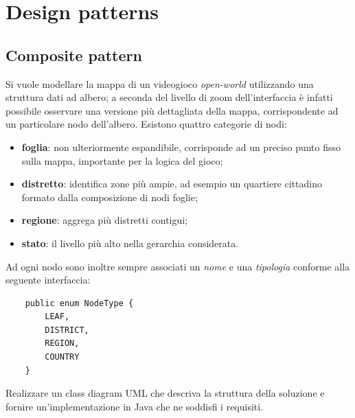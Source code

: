 \documentclass[12pt,a4paper]{article}
\begin{document}
\tableofcontents
\clearpage
	
\section{Design patterns}
    \subsection{Composite pattern}
    
    \begin{Exercise}[label=composite-ex1]
        Si vuole modellare la mappa di un videogioco \textit{open-world} utilizzando una struttura dati ad albero; a seconda del livello di zoom dell'interfaccia è infatti possibile osservare una versione più dettagliata della mappa, corrispondente ad un particolare nodo dell'albero.
        Esistono quattro categorie di nodi:
        \begin{itemize}
            \item \textbf{foglia}: non ulteriormente espandibile, corrisponde ad un preciso punto fisso sulla mappa, importante per la logica del gioco;
            \item \textbf{distretto}: identifica zone più ampie, ad esempio un quartiere cittadino formato dalla composizione di nodi foglie;
            \item \textbf{regione}: aggrega più distretti contigui;
            \item \textbf{stato}: il livello più alto nella gerarchia considerata.
        \end{itemize}
        Ad ogni nodo sono inoltre sempre associati un \textit{nome} e una \textit{tipologia} conforme alla seguente interfaccia:
        \begin{lstlisting}
    public enum NodeType {
        LEAF,
        DISTRICT,
        REGION,
        COUNTRY
    }
        \end{lstlisting}
        
        Realizzare un class diagram UML che descriva la struttura della soluzione e fornire un'implementazione in Java che ne soddisfi i requisiti.
    \end{Exercise}

\end{document}
